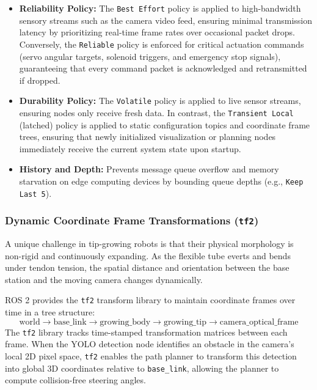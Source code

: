 \begin{itemize}
    \item \textbf{Reliability Policy:} The \texttt{Best Effort} policy is applied to high-bandwidth sensory streams such as the camera video feed, ensuring minimal transmission latency by prioritizing real-time frame rates over occasional packet drops. Conversely, the \texttt{Reliable} policy is enforced for critical actuation commands (servo angular targets, solenoid triggers, and emergency stop signals), guaranteeing that every command packet is acknowledged and retransmitted if dropped.
    \item \textbf{Durability Policy:} The \texttt{Volatile} policy is applied to live sensor streams, ensuring nodes only receive fresh data. In contrast, the \texttt{Transient Local} (latched) policy is applied to static configuration topics and coordinate frame trees, ensuring that newly initialized visualization or planning nodes immediately receive the current system state upon startup.
    \item \textbf{History and Depth:} Prevents message queue overflow and memory starvation on edge computing devices by bounding queue depths (e.g., \texttt{Keep Last 5}).
\end{itemize}

\subsubsection{Dynamic Coordinate Frame Transformations (\texttt{tf2})}
A unique challenge in tip-growing robots is that their physical morphology is non-rigid and continuously expanding. As the flexible tube everts and bends under tendon tension, the spatial distance and orientation between the base station and the moving camera changes dynamically. 

ROS 2 provides the \texttt{tf2} transform library to maintain coordinate frames over time in a tree structure:
\begin{equation}
    \text{world} \longrightarrow \text{base\_link} \longrightarrow \text{growing\_body} \longrightarrow \text{growing\_tip} \longrightarrow \text{camera\_optical\_frame}
\end{equation}
The \texttt{tf2} library tracks time-stamped transformation matrices between each frame. When the YOLO detection node identifies an obstacle in the camera's local 2D pixel space, \texttt{tf2} enables the path planner to transform this detection into global 3D coordinates relative to \texttt{base\_link}, allowing the planner to compute collision-free steering angles.

